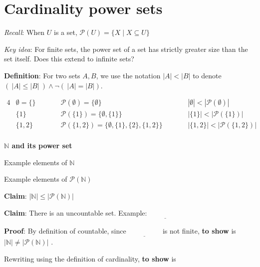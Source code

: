 \documentclass[12pt, oneside]{article}
\begin{document}
\begin{flushright}
\end{flushright} \section*{Cardinality power sets}


{\it Recall}: When $U$ is a set, $\mathcal{P}(U) = \{ X \mid X \subseteq U\}$

{\it Key idea}: For finite sets, the power set of a set has strictly greater size than the set itself.
Does this extend to infinite sets?

{\bf Definition}: For two sets $A, B$, we use the notation $|A| < |B|$ to denote
$(~|A| \leq |B| ~) \land \lnot (~|A| = |B|)$.

\begin{alignat*}{4}
    &\emptyset = \{ \} \qquad &&\mathcal{P}(\emptyset) = \{ \emptyset \} \qquad &&|\emptyset| < |\mathcal{P}(\emptyset)| \\
    &\{1 \} \qquad &&\mathcal{P}(\{1\}) = \{ \emptyset, \{1\} \} \qquad &&|\{1\}| < |\mathcal{P}(\{1\})| \\
    &\{1,2 \} \qquad &&\mathcal{P}(\{1,2\}) = \{ \emptyset, \{1\}, \{2\}, \{1,2\} \} \qquad &&|\{1,2\}| < |\mathcal{P}(\{1,2\})| \\
\end{alignat*}

{\bf $\mathbb{N}$ and its power set}

Example elements of $\mathbb{N}$ 

\vspace{20pt}

Example elements of $\mathcal{P}(\mathbb{N})$

\vspace{20pt}

{\bf Claim}: $| \mathbb{N} | \leq |\mathcal{P} ( \mathbb{N} ) |$

\vspace{100pt}
\newpage
{\bf Claim}: There is an uncountable set.  Example: $\underline{\phantom{~~~\mathcal{P}(\mathbb{N})~~~}}$

{\bf Proof}:  By definition of countable, since $\underline{\phantom{~~~\mathcal{P}(\mathbb{N})~~~}}$
is not finite, {\bf to show} is $|\mathbb{N}| \neq  |\mathcal{P}(\mathbb{N})|$ .

Rewriting using  the definition of  cardinality, {\bf to show} is

\end{document}
